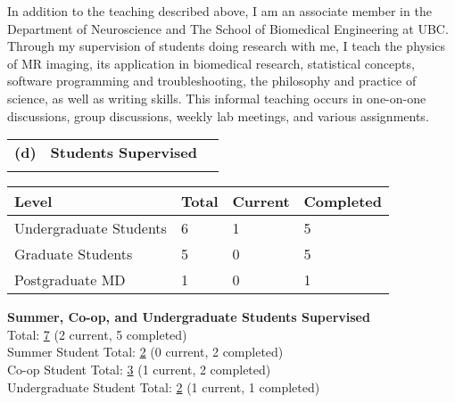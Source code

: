 \documentclass[11pt,notitlepage,english]{report}
\begin{document}
In addition to the teaching described above, I am an associate member in the Department of Neuroscience and The School of Biomedical Engineering at UBC. Through my supervision of students doing research with me, I teach the physics of MR imaging, its application in biomedical research, statistical concepts, software programming and troubleshooting, the philosophy and practice of science, as well as writing skills. This informal teaching occurs in one-on-one discussions, group discussions, weekly lab meetings, and various assignments.


\begin{tabular}{L{.5cm} L{8cm} L{6.9cm}}
  \\
  \textbf{(d)} & \textbf{Students Supervised} \\
  \\
\end{tabular}

\begin{table}[H]
  \label{8d. Students Supervised}
  \centering
  \begin{tabular}{|l|l|l|l|}
    \rowcolor[HTML]{EFEFEF}
    \hline
    Level                  & Total & Current & Completed \\
    \hline
    Undergraduate Students & 6     & 1       & 5         \\
    \hline
    Graduate Students      & 5     & 0       & 5         \\
    \hline
    Postgraduate MD        & 1     & 0       & 1         \\
    \hline
  \end{tabular}
\end{table}

\noindent \textbf{Summer, Co-op, and Undergraduate Students Supervised}
\\

\noindent Total: \underline{7} (2 current, 5 completed) \\
Summer Student Total: \underline{2} (0 current, 2 completed) \\
Co-op Student Total: \underline{3} (1 current, 2 completed) \\
Undergraduate Student Total: \underline{2} (1 current, 1 completed) \\
\end{document}
